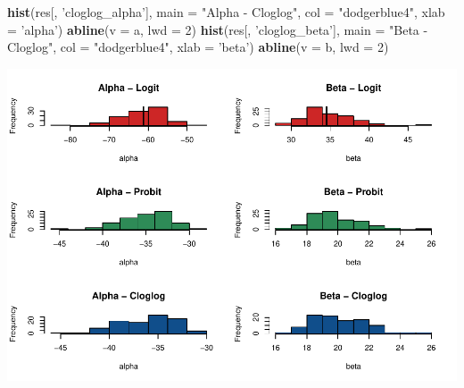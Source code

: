 \documentclass[]{article}
\newenvironment{Shaded}{\begin{snugshade}}{\end{snugshade}}
\newcommand{\DataTypeTok}[1]{\textcolor[rgb]{0.13,0.29,0.53}{#1}}
\newcommand{\DecValTok}[1]{\textcolor[rgb]{0.00,0.00,0.81}{#1}}
\newcommand{\KeywordTok}[1]{\textcolor[rgb]{0.13,0.29,0.53}{\textbf{#1}}}
\newcommand{\NormalTok}[1]{#1}
\newcommand{\OperatorTok}[1]{\textcolor[rgb]{0.81,0.36,0.00}{\textbf{#1}}}
\newcommand{\StringTok}[1]{\textcolor[rgb]{0.31,0.60,0.02}{#1}}
\begin{document}
\begin{Shaded}
\begin{Highlighting}[]
\KeywordTok{hist}\NormalTok{(res[, }\StringTok{'cloglog_alpha'}\NormalTok{], }\DataTypeTok{main =} \StringTok{"Alpha - Cloglog"}\NormalTok{, }\DataTypeTok{col =} \StringTok{"dodgerblue4"}\NormalTok{, }\DataTypeTok{xlab =} \StringTok{'alpha'}\NormalTok{) }
\KeywordTok{abline}\NormalTok{(}\DataTypeTok{v =}\NormalTok{ a, }\DataTypeTok{lwd =} \DecValTok{2}\NormalTok{)}
\KeywordTok{hist}\NormalTok{(res[, }\StringTok{'cloglog_beta'}\NormalTok{], }\DataTypeTok{main =} \StringTok{"Beta - Cloglog"}\NormalTok{, }\DataTypeTok{col =} \StringTok{"dodgerblue4"}\NormalTok{, }\DataTypeTok{xlab =} \StringTok{'beta'}\NormalTok{) }
\KeywordTok{abline}\NormalTok{(}\DataTypeTok{v =}\NormalTok{ b, }\DataTypeTok{lwd =} \DecValTok{2}\NormalTok{)}
\end{Highlighting}
\end{Shaded}

\includegraphics{FinalProject-SDSII_files/figure-latex/unnamed-chunk-36-1.pdf}

\begin{Shaded}
\end{Shaded}
\end{document}
